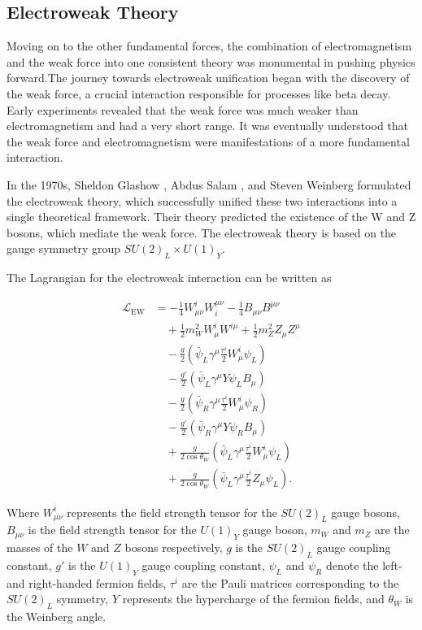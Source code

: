 \subsection{Electroweak Theory}

Moving on to the other fundamental forces,  the combination of electromagnetism  and the weak force into one consistent theory  was monumental in pushing physics forward.The journey towards electroweak unification began with the discovery of the weak force, a crucial interaction responsible for processes like beta decay.
Early experiments revealed that the weak force was much weaker than electromagnetism and had a very short range.
It was eventually understood that the weak force and electromagnetism were manifestations of a more fundamental interaction.

In the 1970s, Sheldon Glashow \cite{Glashow_1959}, Abdus Salam \cite{Salam_1968}, and Steven Weinberg \cite{Weinburg_1967} formulated the electroweak theory, which successfully unified these two interactions into a single theoretical framework.
Their theory predicted the existence of the W and Z bosons, which mediate the weak force.
The electroweak theory is based on the gauge symmetry group $SU(2)_L \times U(1)_Y$.

The Lagrangian for the electroweak interaction can be written as

\begin{align}
\mathcal{L}_{\text{EW}} &= -\frac{1}{4} W^i_{\mu \nu} W^{ \mu \nu}_i - \frac{1}{4} B_{\mu \nu} B^{\mu \nu} \\
&\quad + \frac{1}{2} m_W^2 W^i_\mu W^{i \mu} + \frac{1}{2} m_Z^2 Z_\mu Z^\mu \\
&\quad - \frac{g}{2} \left( \bar{\psi}_L \gamma^\mu \frac{\tau^i}{2} W^i_\mu \psi_L \right) \\
&\quad - \frac{g'}{2} \left( \bar{\psi}_L \gamma^\mu Y \psi_L B_\mu \right) \\
&\quad - \frac{g}{2} \left( \bar{\psi}_R \gamma^\mu \frac{\tau^i}{2} W^i_\mu \psi_R \right) \\
&\quad - \frac{g'}{2} \left( \bar{\psi}_R \gamma^\mu Y \psi_R B_\mu \right) \\
&\quad + \frac{g}{2 \cos \theta_W} \left( \bar{\psi}_L \gamma^\mu \frac{\tau^i}{2} W^i_\mu \psi_L \right) \\
&\quad + \frac{g}{2 \cos \theta_W} \left( \bar{\psi}_L \gamma^\mu \frac{\tau^i}{2} Z_\mu \psi_L \right).
\end{align}

Where $W^i_{\mu \nu}$ represents the field strength tensor for the $SU(2)_L$ gauge bosons, $B_{\mu \nu}$ is the field strength tensor for the $U(1)_Y$ gauge boson, $m_W$ and $m_Z$ are the masses of the $W$ and $Z$ bosons respectively, $g$ is the $SU(2)_L$ gauge coupling constant, $g'$ is the $U(1)_Y$ gauge coupling constant, $\psi_L$ and $\psi_R$ denote the left- and right-handed fermion fields, $\tau^i$ are the Pauli matrices corresponding to the $SU(2)_L$ symmetry, $Y$ represents the hypercharge of the fermion fields, and $\theta_W$ is the Weinberg angle.



